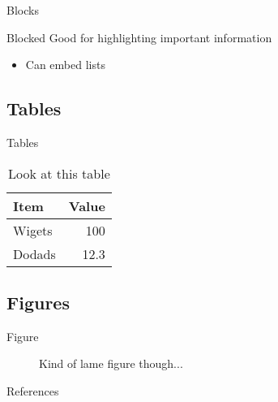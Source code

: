 \documentclass{beamer}
\begin{document}
\begin{frame}{Blocks}
    \begin{block}{Blocked}
        Good for highlighting important information
        \begin{itemize}
            \item{Can embed lists}
        \end{itemize}
    \end{block}
\end{frame}

\subsection{Tables}

\begin{frame}{Tables}
    \begin{table}
        \caption{Look at this table}
        \begin{tabular}{|l|r|}
            \hline
            Item & Value \\
            \hline
            Wigets & 100 \\
            Dodads & 12.3 \\
            \hline
        \end{tabular}
    \end{table}
\end{frame}

\subsection{Figures}
\begin{frame}{Figure}
    \begin{figure}
        \caption{Kind of lame figure though...}
    \end{figure}
\end{frame}

\begin{frame}{References}
    
    
\end{frame}
\end{document}
